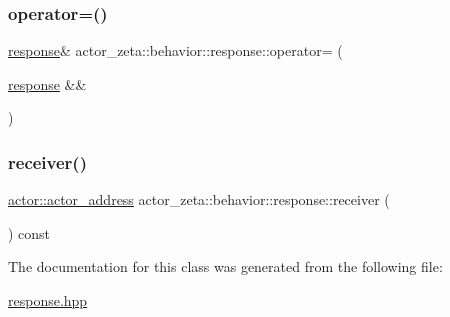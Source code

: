 \mbox{\label{classactor__zeta_1_1behavior_1_1response_ad9b1bd1e4aabb899bc196036a111b427}} 
\subsubsection{\texorpdfstring{operator=()}{operator=()}\hspace{0.1cm}{\footnotesize\ttfamily [2/2]}}
{\footnotesize\ttfamily \hyperlink{classactor__zeta_1_1behavior_1_1response}{response}\& actor\+\_\+zeta\+::behavior\+::response\+::operator= (\begin{DoxyParamCaption}\item[{\hyperlink{classactor__zeta_1_1behavior_1_1response}{response} \&\&}]{ }\end{DoxyParamCaption})\hspace{0.3cm}{\ttfamily [default]}}

\mbox{\label{classactor__zeta_1_1behavior_1_1response_a9735663735901d299d5c8d6ea79005e3}} 
\subsubsection{\texorpdfstring{receiver()}{receiver()}}
{\footnotesize\ttfamily \hyperlink{classactor__zeta_1_1actor_1_1actor__address}{actor\+::actor\+\_\+address} actor\+\_\+zeta\+::behavior\+::response\+::receiver (\begin{DoxyParamCaption}{ }\end{DoxyParamCaption}) const\hspace{0.3cm}{\ttfamily [inline]}}



The documentation for this class was generated from the following file\+:\begin{DoxyCompactItemize}
\item 
\hyperlink{response_8hpp}{response.\+hpp}\end{DoxyCompactItemize}
